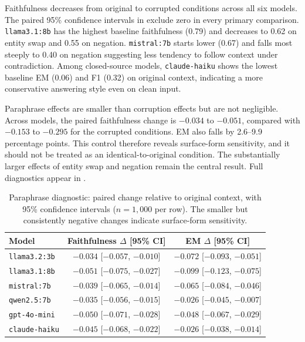 \documentclass[11pt]{article}
\begin{document}
Faithfulness decreases from original to corrupted conditions across all six models. The
paired 95\% confidence intervals in  exclude zero in every
primary comparison. \texttt{llama3.1:8b} has the highest baseline faithfulness (0.79)
and decreases to 0.62 on entity swap and 0.55 on negation.
\texttt{mistral:7b} starts lower (0.67) and falls most steeply to 0.40 on negation
suggesting less tendency to follow context under contradiction. Among
closed-source models, \texttt{claude-haiku} shows the lowest baseline EM (0.06) and F1
(0.32) on original context, indicating a more conservative answering style even on clean
input.

Paraphrase effects are smaller than corruption effects but are not negligible. Across
models, the paired faithfulness change is $-0.034$ to $-0.051$, compared with $-0.153$
to $-0.295$ for the corrupted conditions. EM also falls by 2.6--9.9 percentage points.
This control therefore reveals surface-form sensitivity, and it should not be treated as
an identical-to-original condition. The substantially larger effects of entity swap and
negation remain the central result. Full diagnostics appear in
.

\begin{table}[htbp]
\centering
\caption{Paraphrase diagnostic: paired change relative to original context, with 95\%
  confidence intervals ($n=1{,}000$ per row). The smaller but consistently negative
  changes indicate surface-form sensitivity.}
\label{tab:paraphrase-diagnostic}
\small
\begin{tabular}{lcc}
\toprule
\textbf{Model} & \textbf{Faithfulness $\Delta$ [95\% CI]} & \textbf{EM $\Delta$ [95\% CI]} \\
\midrule
\texttt{llama3.2:3b}  & $-0.034$ [$-0.057$, $-0.010$] & $-0.072$ [$-0.093$, $-0.051$] \\
\texttt{llama3.1:8b}  & $-0.051$ [$-0.075$, $-0.027$] & $-0.099$ [$-0.123$, $-0.075$] \\
\texttt{mistral:7b}   & $-0.039$ [$-0.065$, $-0.014$] & $-0.065$ [$-0.084$, $-0.046$] \\
\texttt{qwen2.5:7b}   & $-0.035$ [$-0.056$, $-0.015$] & $-0.026$ [$-0.045$, $-0.007$] \\
\texttt{gpt-4o-mini}  & $-0.050$ [$-0.071$, $-0.028$] & $-0.048$ [$-0.067$, $-0.029$] \\
\texttt{claude-haiku} & $-0.045$ [$-0.068$, $-0.022$] & $-0.026$ [$-0.038$, $-0.014$] \\
\bottomrule
\end{tabular}
\end{table}
\end{document}
